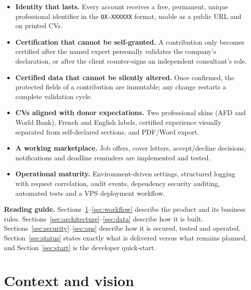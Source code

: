 \documentclass[11pt,a4paper]{article}
\begin{document}
\begin{itemize}[leftmargin=1.4em,itemsep=3pt]
  \item \textbf{Identity that lasts.} Every account receives a free, permanent,
        unique professional identifier in the \texttt{OX-XXXXXX} format, usable
        as a public URL and on printed CVs.
  \item \textbf{Certification that cannot be self-granted.} A contribution only
        becomes certified after the named expert personally validates the
        company's declaration, or after the client counter-signs an independent
        consultant's role.
  \item \textbf{Certified data that cannot be silently altered.} Once confirmed,
        the protected fields of a contribution are immutable; any change
        restarts a complete validation cycle.
  \item \textbf{CVs aligned with donor expectations.} Two professional skins
        (AFD and World Bank), French and English labels, certified experience
        visually separated from self-declared sections, and PDF/Word export.
  \item \textbf{A working marketplace.} Job offers, cover letters,
        accept/decline decisions, notifications and deadline reminders are
        implemented and tested.
  \item \textbf{Operational maturity.} Environment-driven settings, structured
        logging with request correlation, audit events, dependency security
        auditing, automated tests and a VPS deployment workflow.
\end{itemize}

\begin{notebox}
\textbf{Reading guide.} Sections~\ref{sec:context}--\ref{sec:workflow}
describe the product and its business rules. Sections~\ref{sec:architecture}--\ref{sec:data}
describe how it is built. Sections~\ref{sec:security}--\ref{sec:ops} describe
how it is secured, tested and operated. Section~\ref{sec:status} states exactly
what is delivered versus what remains planned, and Section~\ref{sec:start}
is the developer quick-start.
\end{notebox}

\section{Context and vision}
\label{sec:context}
\end{document}
